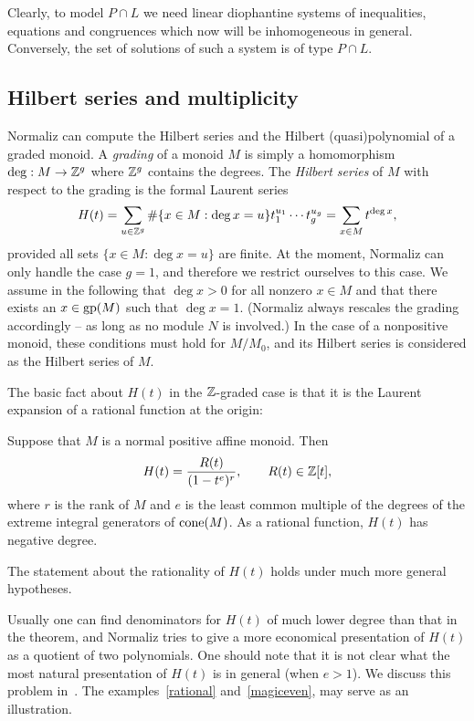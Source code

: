 Clearly, to model $P\cap L$ we need linear diophantine systems of inequalities, equations and congruences which now will be inhomogeneous in general. Conversely, the set of solutions of such a system is of type $P\cap L$.


\subsection{Hilbert series and multiplicity}\label{AppHilbertSeries}

Normaliz can compute the Hilbert series and the Hilbert
(quasi)polynomial of a graded monoid. A \emph{grading} of a
monoid $M$ is simply a homomorphism $\deg:M\to{\mathbb Z}^g$ where
${\mathbb Z}^g$ contains the degrees. The \emph{Hilbert series} of $M$
with respect to the grading is the formal Laurent series
$$
H(t)=\sum_{u\in {\mathbb Z}^g} \#\{x\in M: \deg x=u\}t_1^{u_1}\cdots t_g^{u_g}=\sum_{x\in M}t^{\deg x},
$$
provided all sets $\{x\in M: \deg x=u\}$ are finite. At the moment, Normaliz can only handle the case $g=1$, and therefore we restrict ourselves to this case. We assume in the following that $\deg x >0$ for all nonzero $x\in M$ and that there exists an $x\in\operatorname{gp}(M)$ such that $\deg x=1$. (Normaliz always rescales the grading accordingly -- as long as no module $N$ is involved.) In the case of a nonpositive monoid, these conditions must hold for $M/M_0$, and its Hilbert series is considered as the Hilbert series of $M$.

The basic fact about $H(t)$ in the ${\mathbb Z}$-graded case is that it
is the Laurent expansion of a rational function at the origin:
\begin{theorem}
	Suppose that $M$ is a normal positive affine monoid. Then
	$$
	H(t)=\frac{R(t)}{(1-t^e)^r},\qquad R(t)\in\ZZ[t], %
	$$
	where $r$ is the rank of $M$ and $e$ is the least common multiple
	of the degrees of the extreme integral generators of $\operatorname{cone}(M)$. As a rational function, $H(t)$ has negative degree.
\end{theorem}

The statement about the rationality of $H(t)$ holds under much more general hypotheses.

Usually one can find denominators for $H(t)$ of much lower
degree than that in the theorem, and Normaliz tries to
give a more economical presentation of $H(t)$ as a quotient of
two polynomials. One should note that it is not clear what the
most natural presentation of $H(t)$ is in general (when $e>1$).
We discuss this problem in~\cite[Section~4]{BIS}. The examples~\ref{rational} and~\ref{magiceven}, may serve as
an illustration.


